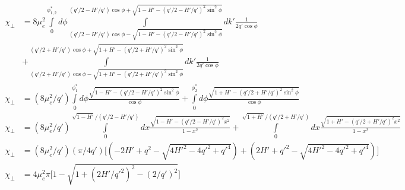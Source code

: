 \documentclass{article}
\begin{document}
    \begin{align*}
 \chi_\perp&=8\mu_e^2 \int\limits_0^{\phi^*_{1,2}} d\phi \int\limits_{(q'/2-H'/q')\cos\phi - \sqrt{1-H'-(q'/2-H'/q')^2\sin^2\phi}}^{(q'/2-H'/q')\cos\phi + \sqrt{1-H'-(q'/2-H'/q')^2\sin^2\phi}}dk'  \frac{ 1}{ 2q'\cos\phi} \\
 &+\int\limits_{(q'/2+H'/q')\cos\phi - \sqrt{1+H'-(q'/2+H'/q')^2\sin^2\phi}}^{(q'/2+H'/q')\cos\phi + \sqrt{1+H'-(q'/2+H'/q')^2\sin^2\phi}} dk'  \frac{ 1}{ 2q'\cos\phi}  \\
  \chi_\perp&=(8\mu_e^2/q') \int\limits_0^{\phi^*_{1}} d\phi   \frac{ \sqrt{1-H'-(q'/2-H'/q')^2\sin^2\phi}}{ \cos\phi} 
 + \int\limits_0^{\phi^*_{2}} d\phi \frac{  \sqrt{1+H'-(q'/2+H'/q')^2\sin^2\phi}}{ \cos\phi}  \\
   \chi_\perp&=(8\mu_e^2/q') \int\limits_0^{\sqrt{1-H'}/(q'/2-H'/q')} dx \frac{ \sqrt{1-H'-(q'/2-H'/q')^2x^2}}{ 1-x^2} 
 +\int\limits_0^{\sqrt{1+H'}/(q'/2+H'/q')} dx \frac{  \sqrt{1+H'-(q'/2+H'/q')^2 x^2}}{ 1-x^2}  \\
  \chi_\perp&=(8\mu_e^2/q') (\pi/4q')\bigg[(-2H'+q^2-\sqrt{4H'^2-4q'^2+q'^4})+(2H'+q'^2-\sqrt{4H'^2-4q'^2+q'^4})\bigg] \\
    \chi_\perp&=4\mu_e^2\pi \bigg[1-\sqrt{1+(2H'/q'^2)^2-(2/q')^2}\bigg] \\
 \end{align*}
 
\end{document}
